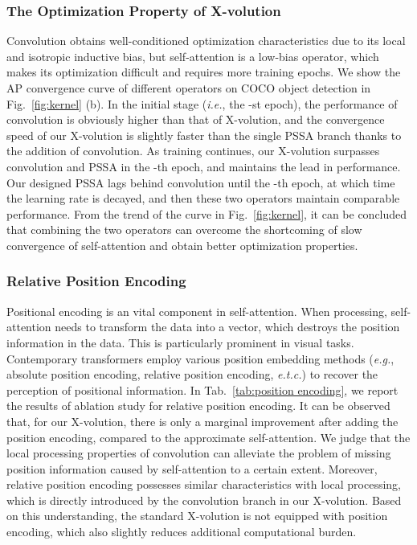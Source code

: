 \documentclass{article}
\begin{document}
\subsubsection{The Optimization Property of X-volution}\label{sec_optimization}
Convolution obtains well-conditioned optimization characteristics due to its local and isotropic inductive bias, but self-attention is a low-bias operator, which makes its optimization difficult and requires more training epochs.
We show the AP convergence curve of different operators on COCO object detection in Fig.~\ref{fig:kernel} (b). In the initial stage (\emph{i.e.}, the -st epoch), the performance of convolution is obviously higher than that of X-volution, and the convergence speed of our X-volution is slightly faster than the single PSSA branch thanks to the addition of convolution.
As training continues, our X-volution surpasses convolution and PSSA in the -th epoch, and maintains the lead in performance.
Our designed PSSA lags behind convolution until the -th epoch, at which time the learning rate is decayed, and then these two operators maintain comparable performance.
From the trend of the curve in Fig.~\ref{fig:kernel}, it can be concluded that combining the two operators can overcome the shortcoming of slow convergence of self-attention and obtain better optimization properties.


\vspace{2mm}
\subsubsection{Relative Position Encoding}
Positional encoding\cite{DBLP:conf/nips/VaswaniSPUJGKP17, DBLP:conf/naacl/ShawUV18} is an vital component in self-attention.
When processing, self-attention needs to transform the data into a vector, which destroys the position information in the data.
This is particularly prominent in visual tasks.
Contemporary transformers\cite{DBLP:journals/corr/abs-2103-14030, DBLP:journals/corr/abs-2101-11605, DBLP:conf/eccv/CarionMSUKZ20} employ various position embedding methods (\emph{e.g.}, absolute position encoding, relative position encoding, \emph{e.t.c.}) to recover the perception of positional information.
In Tab.~\ref{tab:position encoding}, we report the results of ablation study for relative position encoding.
It can be observed that, for our X-volution, there is only a marginal improvement after adding the position encoding, compared to the approximate self-attention.
We judge that the local processing properties of convolution can alleviate the problem of missing position information caused by self-attention to a certain extent.
Moreover, relative position encoding possesses similar characteristics with local processing, which is directly introduced by the convolution branch in our X-volution.
Based on this understanding, the standard X-volution is not equipped with position encoding, which also slightly reduces additional computational burden.
\end{document}
